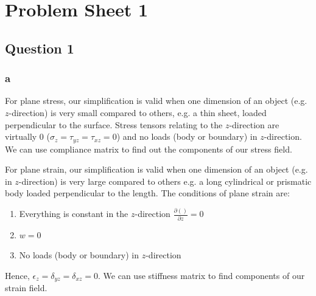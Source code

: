 \chapter{Problem Sheet 1}
\section{Question 1}
\subsection{a}
For plane stress, our simplification is valid when one dimension of an object (e.g. $z$-direction) is very small compared to others, e.g. a thin sheet, loaded perpendicular to the surface. Stress tensors relating to the $z$-direction are virtually 0 ($\sigma_z = \tau_{yz} = \tau_{xz} =0$) and no loads (body or boundary) in $z$-direction. We can use compliance matrix to find out the components of our stress field.

For plane strain, our simplification is valid when one dimension of an object (e.g. in $z$-direction) is very large compared to others e.g. a long cylindrical or prismatic body loaded perpendicular to the length. The conditions of plane strain are:
\begin{enumerate}
    \item Everything is constant in the $z$-direction $\frac{\partial ()}{\partial z} = 0$
    \item $w = 0$
    \item No loads (body or boundary) in $z$-direction
\end{enumerate}
Hence, $\epsilon_z = \delta_{yz} = \delta_{xz} =0$. We can use stiffness matrix to find components of our strain field.
